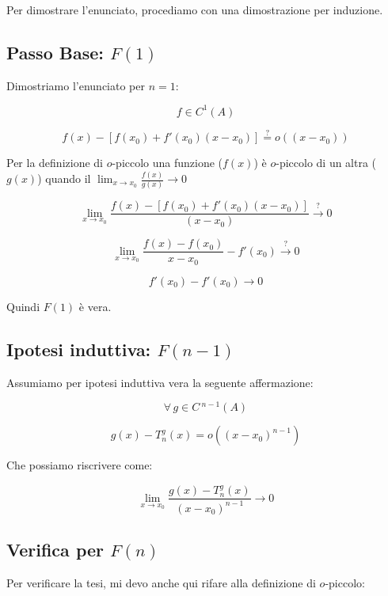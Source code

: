 \documentclass[../dimostrazioni]{subfiles}
\begin{document}
        Per dimostrare l'enunciato, procediamo con una dimostrazione per induzione.

        \medskip

        \subsection*{Passo Base: \(F(1)\)}

        Dimostriamo l'enunciato per \(n = 1\):
        
        \[  f \in C^1(A)  \]

        \[  f(x) - \left[ f(x_0) + f'(x_0)(x-x_0) \right] \stackrel{?}{=}  o ((x-x_0))  \]

        Per la definizione di \(o\)-piccolo una funzione (\(f(x)\)) è \(o\)-piccolo di un altra (\(g(x)\)) quando il \( \lim_{x \to x_0} \frac{f(x)}{g(x)} \rightarrow 0\) 
        
        \[    \lim_{x \to x_0} \frac{f(x) - \left[ f(x_0) + f'(x_0)(x-x_0) \right]}{(x-x_0)} \stackrel{?}{\rightarrow} 0 \]
            
        \[    \lim_{x \to x_0} \frac{f(x) - f(x_0)}{x - x_0} - f'(x_0) \stackrel{?}{\rightarrow} 0 \]

        \[    f'(x_0) - f'(x_0) \rightarrow 0 \]

        Quindi \(F(1)\) è vera. 

        \subsection*{Ipotesi induttiva: \(F(n-1)\)}

        Assumiamo per ipotesi induttiva vera la seguente affermazione:
        
        \[  \forall \, g \in C\,^{n-1} (A) \]

        \[  g(x) - T _n ^ g (x) = o ((x-x_0)^{n-1}) \]

        Che possiamo riscrivere come:

        \[  \lim_{x \to x_0} \frac{g(x) - T _n ^ g (x)}{(x-x_0)^{n-1}} \rightarrow 0 \]

        \subsection*{Verifica per \(F(n)\)}

        Per verificare la tesi, mi devo anche qui rifare alla definizione di \(o\)-piccolo:
        
\end{document}
